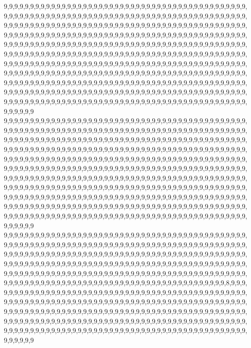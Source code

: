 9,9,9,9,9,9,9,9,9,9,9,9,9,9,9,9,9,9,9,9,9,9,9,9,9,9,9,9,9,9,9,9,9,9,9,9,9,9,9,9,9,9,9,9,9,9,9,9,9,9,9,9,9,9,9,9,9,9,9,9,9,9,9,9,9,9,9,9,9,9,9,9,9,9,9,9,9,9,9,9,9,9,9,9,9,9,9,9,9,9,9,9,9,9,9,9,9,9,9,9,9,9,9,9,9,9,9,9,9,9,9,9,9,9,9,9,9,9,9,9,9,9,9,9,9,9,9,9,9,9,9,9,9,9,9,9,9,9,9,9,9,9,9,9,9,9,9,9,9,9,9,9,9,9,9,9,9,9,9,9,9,9,9,9,9,9,9,9,9,9,9,9,9,9,9,9,9,9,9,9,9,9,9,9,9,9,9,9,9,9,9,9,9,9,9,9,9,9,9,9,9,9,9,9,9,9,9,9,9,9,9,9,9,9,9,9,9,9,9,9,9,9,9,9,9,9,9,9,9,9,9,9,9,9,9,9,9,9,9,9,9,9,9,9,9,9,9,9,9,9,9,9,9,9,9,9,9,9,9,9,9,9,9,9,9,9,9,9,9,9,9,9,9,9,9,9,9,9,9,9,9,9,9,9,9,9,9,9,9,9,9,9,9,9,9,9,9,9,9,9,9,9,9,9,9,9,9,9,9,9,9,9,9,9,9,9,9,9,9,9,9,9,9,9,9,9,9,9,9,9,9,9,9,9,9,9,9,9,9,9,9,9,9,9,9,9,9,9,9,9,9,9,9,9,9,9,9,9,9,9,9,9,9,9,9,9,9,9,9,9,9,9,9,9,9,9,9,9,9,9,9,9,9,9,9,9,9,9,9,9,9,9,9,9,9,9,9,9,9,9,9,9,9,9,9,9,9,9,9,9,9,9,9,9,9,9,9,9,9,9,9,9,9,9,9,9,9,9,9,9,9,9,9,9,9,9,9,9,9,9,9,9,9,9,9,9,9,9,9,9,9,9,9,9,9,9,9,9,9,9,9,9,9,9,9,9,9,9,9,9,9,9,9,9,9,9,9,9,9,9,9,9,9,9,9,9,9,9,9,9,9,9,9,9,9,9,9,9,9,9,9,9,9,9,9,9,9,9,9,9,9,9
9,9,9,9,9,9,9,9,9,9,9,9,9,9,9,9,9,9,9,9,9,9,9,9,9,9,9,9,9,9,9,9,9,9,9,9,9,9,9,9,9,9,9,9,9,9,9,9,9,9,9,9,9,9,9,9,9,9,9,9,9,9,9,9,9,9,9,9,9,9,9,9,9,9,9,9,9,9,9,9,9,9,9,9,9,9,9,9,9,9,9,9,9,9,9,9,9,9,9,9,9,9,9,9,9,9,9,9,9,9,9,9,9,9,9,9,9,9,9,9,9,9,9,9,9,9,9,9,9,9,9,9,9,9,9,9,9,9,9,9,9,9,9,9,9,9,9,9,9,9,9,9,9,9,9,9,9,9,9,9,9,9,9,9,9,9,9,9,9,9,9,9,9,9,9,9,9,9,9,9,9,9,9,9,9,9,9,9,9,9,9,9,9,9,9,9,9,9,9,9,9,9,9,9,9,9,9,9,9,9,9,9,9,9,9,9,9,9,9,9,9,9,9,9,9,9,9,9,9,9,9,9,9,9,9,9,9,9,9,9,9,9,9,9,9,9,9,9,9,9,9,9,9,9,9,9,9,9,9,9,9,9,9,9,9,9,9,9,9,9,9,9,9,9,9,9,9,9,9,9,9,9,9,9,9,9,9,9,9,9,9,9,9,9,9,9,9,9,9,9,9,9,9,9,9,9,9,9,9,9,9,9,9,9,9,9,9,9,9,9,9,9,9,9,9,9,9,9,9,9,9,9,9,9,9,9,9,9,9,9,9,9,9,9,9,9,9,9,9,9,9,9,9,9,9,9,9,9,9,9,9,9,9,9,9,9,9,9,9,9,9,9,9,9,9,9,9,9,9,9,9,9,9,9,9,9,9,9,9,9,9,9,9,9,9,9,9,9,9,9,9,9,9,9,9,9,9,9,9,9,9,9,9,9,9,9,9,9,9,9,9,9,9,9,9,9,9,9,9,9,9,9,9,9,9,9,9,9,9,9,9,9,9,9,9,9,9,9,9,9,9,9,9,9,9,9,9,9,9,9,9,9,9,9,9,9,9,9,9,9,9,9,9,9,9,9,9,9,9,9,9,9,9,9,9,9,9,9,9,9,9,9,9,9,9,9,9,9,9,9,9,9,9,9,9,9,9,9,9,9,9,9
9,9,9,9,9,9,9,9,9,9,9,9,9,9,9,9,9,9,9,9,9,9,9,9,9,9,9,9,9,9,9,9,9,9,9,9,9,9,9,9,9,9,9,9,9,9,9,9,9,9,9,9,9,9,9,9,9,9,9,9,9,9,9,9,9,9,9,9,9,9,9,9,9,9,9,9,9,9,9,9,9,9,9,9,9,9,9,9,9,9,9,9,9,9,9,9,9,9,9,9,9,9,9,9,9,9,9,9,9,9,9,9,9,9,9,9,9,9,9,9,9,9,9,9,9,9,9,9,9,9,9,9,9,9,9,9,9,9,9,9,9,9,9,9,9,9,9,9,9,9,9,9,9,9,9,9,9,9,9,9,9,9,9,9,9,9,9,9,9,9,9,9,9,9,9,9,9,9,9,9,9,9,9,9,9,9,9,9,9,9,9,9,9,9,9,9,9,9,9,9,9,9,9,9,9,9,9,9,9,9,9,9,9,9,9,9,9,9,9,9,9,9,9,9,9,9,9,9,9,9,9,9,9,9,9,9,9,9,9,9,9,9,9,9,9,9,9,9,9,9,9,9,9,9,9,9,9,9,9,9,9,9,9,9,9,9,9,9,9,9,9,9,8,9,9,9,9,9,9,9,9,9,9,9,9,9,9,9,9,9,9,9,9,9,9,9,9,9,9,9,9,9,9,9,9,9,9,9,9,9,9,9,9,9,9,9,9,9,9,9,9,9,9,9,9,9,9,9,9,9,9,9,9,9,9,9,9,9,9,9,9,9,9,9,9,9,9,9,9,9,9,9,9,9,9,9,9,9,9,9,9,9,9,9,9,9,9,9,9,9,9,9,9,9,9,9,9,9,9,9,9,9,9,9,9,9,9,9,9,9,9,9,9,9,9,9,9,9,9,9,9,9,9,9,9,9,9,9,9,9,9,9,9,9,9,9,9,9,9,9,9,9,9,9,9,9,9,9,9,9,9,9,9,9,9,9,9,9,9,9,9,9,9,9,9,9,9,9,9,9,9,9,9,9,9,9,9,9,9,9,9,9,9,9,9,9,9,9,9,9,9,9,9,9,9,9,9,9,9,9,9,9,9,9,9,9,9,9,9,9,9,9,9,9,9,9,9,9,9,9,9,9,9,9,9,9,9,9,9,9,9,9
